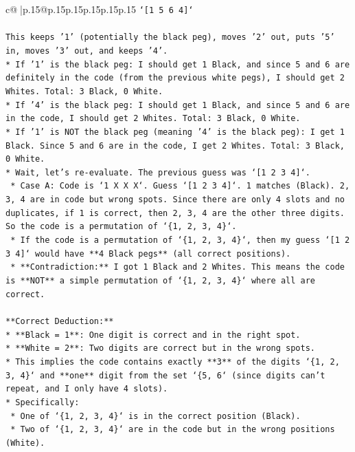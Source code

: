 \documentclass{article}
\begin{document}
{\begin{supertabular}{c@{$\;$}|p{.15\linewidth}@{}p{.15\linewidth}p{.15\linewidth}p{.15\linewidth}p{.15\linewidth}p{.15\linewidth}}
{{{\texttt{`{[}1 5 6 4{]}`} \\
\\ 
\texttt{This keeps '1' (potentially the black peg), moves '2' out, puts '5' in, moves '3' out, and keeps '4'.} \\
\texttt{*   If '1' is the black peg: I should get 1 Black, and since 5 and 6 are definitely in the code (from the previous white pegs), I should get 2 Whites. Total: 3 Black, 0 White.} \\
\texttt{*   If '4' is the black peg: I should get 1 Black, and since 5 and 6 are in the code, I should get 2 Whites. Total: 3 Black, 0 White.} \\
\texttt{*   If '1' is NOT the black peg (meaning '4' is the black peg): I get 1 Black. Since 5 and 6 are in the code, I get 2 Whites. Total: 3 Black, 0 White.} \\
\texttt{*   Wait, let's re{-}evaluate. The previous guess was `{[}1 2 3 4{]}`.} \\
\texttt{    *   Case A: Code is `1 X X X`. Guess `{[}1 2 3 4{]}`. 1 matches (Black). 2, 3, 4 are in code but wrong spots. Since there are only 4 slots and no duplicates, if 1 is correct, then 2, 3, 4 are the other three digits. So the code is a permutation of `\{1, 2, 3, 4\}`.} \\
\texttt{    *   If the code is a permutation of `\{1, 2, 3, 4\}`, then my guess `{[}1 2 3 4{]}` would have **4 Black pegs** (all correct positions).} \\
\texttt{    *   **Contradiction:** I got 1 Black and 2 Whites. This means the code is **NOT** a simple permutation of `\{1, 2, 3, 4\}` where all are correct.} \\
\\ 
\texttt{**Correct Deduction:**} \\
\texttt{*   **Black = 1**: One digit is correct and in the right spot.} \\
\texttt{*   **White = 2**: Two digits are correct but in the wrong spots.} \\
\texttt{*   This implies the code contains exactly **3** of the digits `\{1, 2, 3, 4\}` and **one** digit from the set `\{5, 6` (since digits can't repeat, and I only have 4 slots).} \\
\texttt{*   Specifically:} \\
\texttt{    *   One of `\{1, 2, 3, 4\}` is in the correct position (Black).} \\
\texttt{    *   Two of `\{1, 2, 3, 4\}` are in the code but in the wrong positions (White).} \\
}}}
\end{supertabular}}
\end{document}
